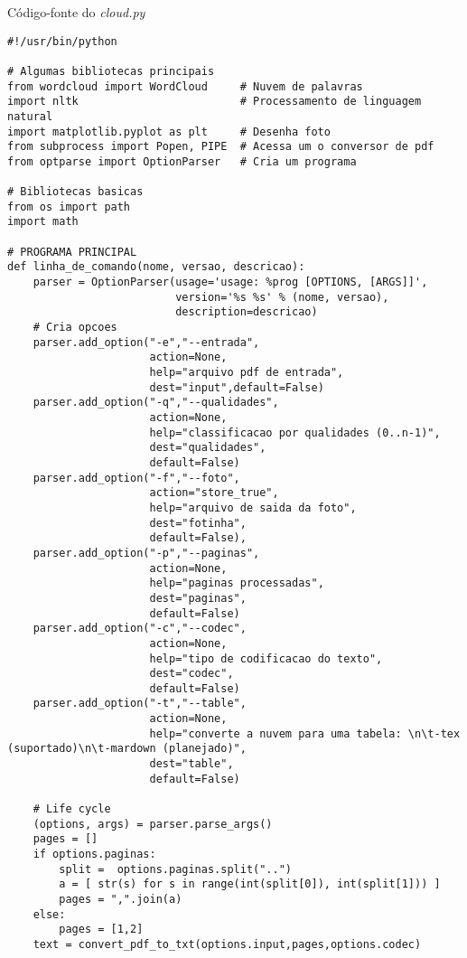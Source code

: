 \begin{example}{Código-fonte do \emph{cloud.py}}
\begin{verbatim}
#!/usr/bin/python

# Algumas bibliotecas principais
from wordcloud import WordCloud     # Nuvem de palavras
import nltk                         # Processamento de linguagem natural
import matplotlib.pyplot as plt     # Desenha foto
from subprocess import Popen, PIPE  # Acessa um o conversor de pdf
from optparse import OptionParser   # Cria um programa

# Bibliotecas basicas
from os import path
import math

# PROGRAMA PRINCIPAL
def linha_de_comando(nome, versao, descricao): 
    parser = OptionParser(usage='usage: %prog [OPTIONS, [ARGS]]', 
                          version='%s %s' % (nome, versao), 
                          description=descricao)
    # Cria opcoes
    parser.add_option("-e","--entrada",
                      action=None,
                      help="arquivo pdf de entrada",
                      dest="input",default=False)
    parser.add_option("-q","--qualidades",
                      action=None,
                      help="classificacao por qualidades (0..n-1)",
                      dest="qualidades",
                      default=False)
    parser.add_option("-f","--foto",
                      action="store_true", 
                      help="arquivo de saida da foto",
                      dest="fotinha",
                      default=False),
    parser.add_option("-p","--paginas",
                      action=None,
                      help="paginas processadas",
                      dest="paginas",
                      default=False)
    parser.add_option("-c","--codec",
                      action=None,
                      help="tipo de codificacao do texto",
                      dest="codec",
                      default=False)
    parser.add_option("-t","--table",
                      action=None,
                      help="converte a nuvem para uma tabela: \n\t-tex (suportado)\n\t-mardown (planejado)",
                      dest="table",
                      default=False)

    # Life cycle
    (options, args) = parser.parse_args()
    pages = []
    if options.paginas:
        split =  options.paginas.split("..") 
        a = [ str(s) for s in range(int(split[0]), int(split[1])) ]
        pages = ",".join(a)
    else:
        pages = [1,2]
    text = convert_pdf_to_txt(options.input,pages,options.codec)
    

\end{verbatim}
\end{example}
